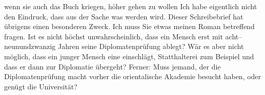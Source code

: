 \begin{ledgroupsized}[t]{13cm}
                    wenn sie auch das Buch
                    kriegen, höher gehen zu wollen{\dotstwo} Ich habe eigentlich
                    nicht den Eindruck, dass aus der Sache was werden wird. Dieser Schreibebrief hat
                    übrigens einen besonderen Zweck. Ich muss Sie etwas meinen Roman betreffend fragen. Ist es nicht
                    höchst unwahrscheinlich, dass ein Mensch erst mit acht–neunundzwanzig Jahren
                    seine Diplomatenprüfung ablegt? Wär es aber nicht möglich, dass ein junger
                    Mensch eine \label{T_L01707_2v}\label{T_L01707_2h} einschlägt, Statthalterei zum
                    Beispiel und dass er dann zur Diplomatie übergeht? Ferner: Muss jemand, der die
                    Diplomatenprüfung macht vorher die orientalische
                        Akademie besucht haben, oder genügt die Universität?\pend
           \endnumbering{}\end{ledgroupsized}  \newcommand{\dateiname}{L01707}\newcommand{\titel}{Arthur Schnitzler an Hugo von Hofmannsthal, 16. 9. 1907}\newcommand{\editorInnen}{Martin Anton Müller und Gerd-Hermann Susen}
            \footnotesize
\begin{ledgroupsized}[t]{11.5cm}
\end{ledgroupsized}
         
      